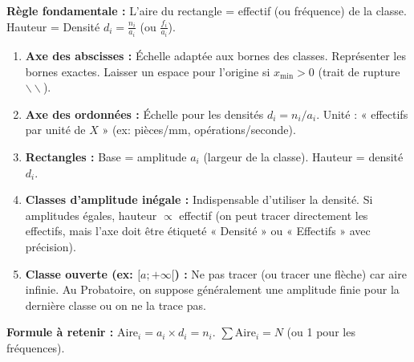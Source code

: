 \documentclass[11pt]{article}
\newcommand{\cle}[1]{{\popxbold\color{popdark}#1}}
\begin{document}
\begin{methode}
    \textbf{Règle fondamentale :} \cle{L'aire du rectangle = effectif (ou fréquence) de la classe}. Hauteur = \cle{Densité} $d_i = \frac{n_i}{a_i}$ (ou $\frac{f_i}{a_i}$).
    \begin{enumerate}
        \item \textbf{Axe des abscisses :} Échelle adaptée aux bornes des classes. Représenter les bornes exactes. Laisser un espace pour l'origine si $x_{\min} > 0$ (trait de rupture $\backslash\backslash$).
        \item \textbf{Axe des ordonnées :} Échelle pour les densités $d_i = n_i / a_i$. Unité : « effectifs par unité de $X$ » (ex: pièces/mm, opérations/seconde).
        \item \textbf{Rectangles :} Base = amplitude $a_i$ (largeur de la classe). Hauteur = densité $d_i$.
        \item \textbf{Classes d'amplitude inégale :} Indispensable d'utiliser la densité. Si amplitudes égales, hauteur $\propto$ effectif (on peut tracer directement les effectifs, mais l'axe doit être étiqueté « Densité » ou « Effectifs » avec précision).
        \item \textbf{Classe ouverte (ex: $[a; +\infty[$) :} Ne pas tracer (ou tracer une flèche) car aire infinie. Au Probatoire, on suppose généralement une amplitude finie pour la dernière classe ou on ne la trace pas.
    \end{enumerate}
    \textbf{Formule à retenir :} $\text{Aire}_i = a_i \times d_i = n_i$. $\sum \text{Aire}_i = N$ (ou 1 pour les fréquences).
\end{methode}
\end{document}
